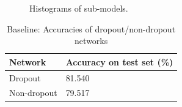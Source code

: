 \documentclass{article} %
\begin{document}
\begin{figure}
\centering 
{} 
\caption{ Histograms of sub-models.}
\label{hist} 
\end{figure}

\begin{table}
\centering 
    \begin{tabular}{l|l}
    \hline
    Network     & Accuracy on test set (\%) \\ \hline
    Dropout     & 81.540                 \\ \hline
    Non-dropout & 79.517                 \\ \hline
    \end{tabular}
     \caption{Baseline: Accuracies of dropout/non-dropout networks}   
     \label{table1}
\end{table}
\end{document}
